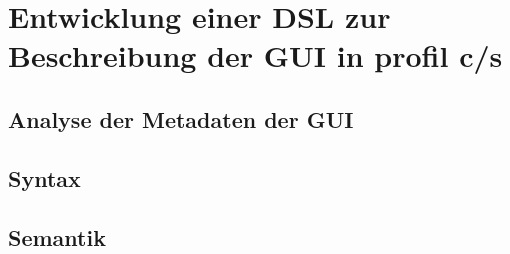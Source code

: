 \chapter{Entwicklung einer DSL zur Beschreibung der GUI in profil c/s}\label{Entwicklung einer DSL zur Beschreibung der GUI in profil c/s}
\section{Analyse der Metadaten der GUI}
\section{Syntax}
\section{Semantik}

